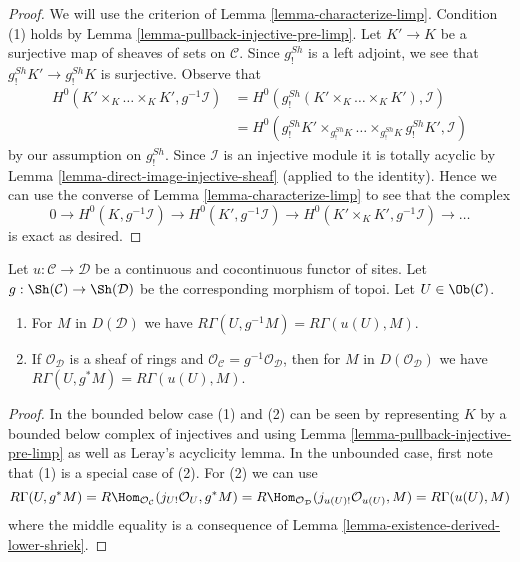 \begin{proof}
We will use the criterion of Lemma \ref{lemma-characterize-limp}.
Condition (1) holds by Lemma \ref{lemma-pullback-injective-pre-limp}.
Let $K' \to K$ be a surjective map of sheaves of sets on $\mathcal{C}$.
Since $g_!^{Sh}$ is a left adjoint,
we see that $g_!^{Sh}K' \to g_!^{Sh}K$ is surjective.
Observe that
\begin{align*}
H^0(K' \times_K \ldots \times_K K', g^{-1}\mathcal{I}) 
& =
H^0(g_!^{Sh}(K' \times_K \ldots \times_K K'), \mathcal{I}) \\
& =
H^0(g_!^{Sh}K' \times_{g_!^{Sh}K} \ldots \times_{g_!^{Sh}K} g_!^{Sh}K',
\mathcal{I})
\end{align*}
by our assumption on $g_!^{Sh}$. Since $\mathcal{I}$ is an injective module
it is totally acyclic by Lemma \ref{lemma-direct-image-injective-sheaf}
(applied to the identity). Hence we can use the converse of
Lemma \ref{lemma-characterize-limp} to see that the complex
$$
0 \to H^0(K, g^{-1}\mathcal{I}) \to H^0(K', g^{-1}\mathcal{I}) \to
H^0(K' \times_K K', g^{-1}\mathcal{I}) \to \ldots
$$
is exact as desired.
\end{proof}

\begin{lemma}
\label{lemma-pullback-same-cohomology}
Let $u : \mathcal{C} \to \mathcal{D}$ be a continuous and cocontinuous
functor of sites. Let $g : \Sh(\mathcal{C}) \to \Sh(\mathcal{D})$
be the corresponding morphism of topoi. Let $U \in \Ob(\mathcal{C})$.
\begin{enumerate}
\item For $M$ in $D(\mathcal{D})$ we have
$R\Gamma(U, g^{-1}M) = R\Gamma(u(U), M)$.
\item If $\mathcal{O}_\mathcal{D}$ is a sheaf of rings and
$\mathcal{O}_\mathcal{C} = g^{-1}\mathcal{O}_\mathcal{D}$, then
for $M$ in $D(\mathcal{O}_\mathcal{D})$ we have
$R\Gamma(U, g^*M) = R\Gamma(u(U), M)$.
\end{enumerate}
\end{lemma}

\begin{proof}
In the bounded below case (1) and (2) can be seen by representing
$K$ by a bounded below complex of injectives and using
Lemma \ref{lemma-pullback-injective-pre-limp} as well as
Leray's acyclicity lemma.
In the unbounded case, first note that
(1) is a special case of (2). For (2) we can use
$$
R\Gamma(U, g^*M) =
R\Hom_{\mathcal{O}_\mathcal{C}}(j_{U!}\mathcal{O}_U, g^*M) =
R\Hom_{\mathcal{O}_\mathcal{D}}(j_{u(U)!}\mathcal{O}_{u(U)}, M) =
R\Gamma(u(U), M)
$$
where the middle equality is a consequence of
Lemma \ref{lemma-existence-derived-lower-shriek}.
\end{proof}

